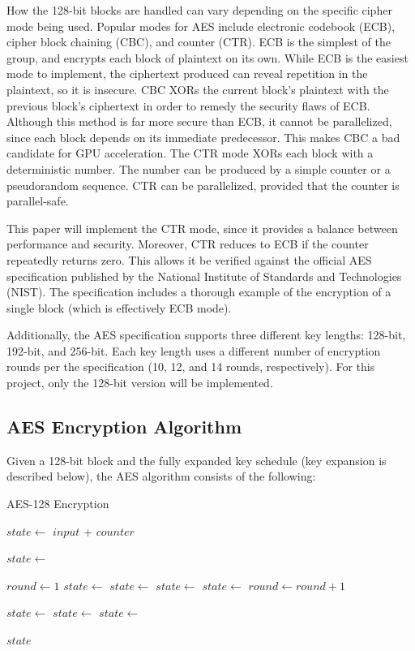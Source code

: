 \documentclass[a4paper,10pt]{article}
\begin{document}
How the 128-bit blocks are handled can vary depending on the specific cipher mode being used.  Popular modes for AES include electronic codebook (ECB), cipher block chaining (CBC), and counter (CTR)\cite{intel}.  ECB is the simplest of the group, and encrypts each block of plaintext on its own.  While ECB is the easiest mode to implement, the ciphertext produced can reveal repetition in the plaintext, so it is insecure.  CBC XORs the current block's plaintext with the previous block's ciphertext in order to remedy the security flaws of ECB.  Although this method is far more secure than ECB, it cannot be parallelized, since each block depends on its immediate predecessor.  This makes CBC a bad candidate for GPU acceleration.  The CTR mode XORs each block with a deterministic number.  The number can be produced by a simple counter or a pseudorandom sequence.  CTR can be parallelized, provided that the counter is parallel-safe.

This paper will implement the CTR mode, since it provides a balance between performance and security.  Moreover, CTR  reduces to ECB if the counter repeatedly returns zero.  This allows it be verified against the official AES specification published by the National Institute of Standards and Technologies (NIST).  The specification includes a thorough example of the encryption of a single block (which is effectively ECB mode).

Additionally, the AES specification supports three different key lengths: 128-bit, 192-bit, and 256-bit.  Each key length uses a different number of encryption rounds per the specification (10, 12, and 14 rounds, respectively).  For this project, only the 128-bit version will be implemented.

\subsection{AES Encryption Algorithm}

Given a 128-bit block and the fully expanded key schedule (key expansion is described below), the AES algorithm consists of the following\cite{nist}:

\begin{algorithm}
\caption{AES-128 Encryption}
\begin{algorithmic}[1]

\State $state\gets$ $input$ + $counter$

\State $state\gets$ 

\State $round\gets 1$
    \State $state\gets$ 
    \State $state\gets$ 
    \State $state\gets$ 
    \State $state\gets$ 
    \State $round\gets round + 1$
\EndWhile

\State $state\gets$ 
\State $state\gets$ 
\State $state\gets$ 

\State \Return $state$
\EndFunction
\end{algorithmic}
\end{algorithm}
\end{document}
